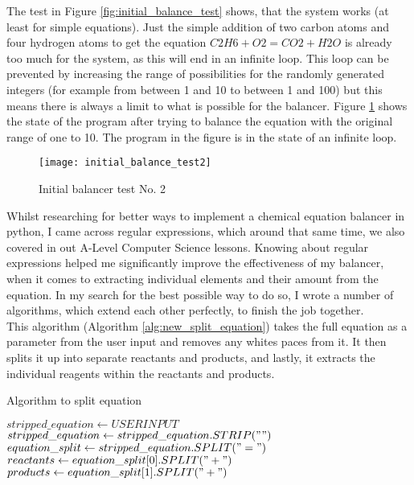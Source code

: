 \documentclass[a4paper,12pt]{article}
\begin{document}
The test in Figure \ref{fig:initial_balance_test} shows, that the system works (at least for simple equations). Just the simple addition of two carbon atoms and four hydrogen atoms to get the equation $ C2H6 + O2 = CO2 + H2O$ is already too much for the system, as this will end in an infinite loop. This loop can be prevented by increasing the range of possibilities for the randomly generated integers (for example from between 1 and 10 to between 1 and 100) but this means there is always a limit to what is possible for the balancer. Figure \ref{fig:second_balance_test} shows the state of the program after trying to balance the equation with the original range of one to 10. The program in the figure is in the state of an infinite loop.

\begin{figure} [h]
	\centering
	\texttt{[image: initial\_balance\_test2]}
	\caption{Initial balancer test No. 2}
	\label{fig:second_balance_test}
\end{figure}

\newpage

Whilst researching for better ways to implement a chemical equation balancer in python, I came across regular expressions, which around that same time, we also covered in out A-Level Computer Science lessons. Knowing about regular expressions helped me significantly improve the effectiveness of my balancer, when it comes to extracting individual elements and their amount from the equation. In my search for the best possible way to do so, I wrote a number of algorithms, which extend each other perfectly, to finish the job together.\\
This algorithm (Algorithm \ref{alg:new_split_equation}) takes the full equation as a parameter from the user input and removes any whites paces from it. It then splits it up into separate reactants and products, and lastly, it extracts the individual reagents within the reactants and products.
\begin{algorithm}
\caption{Algorithm to split equation}\label{alg:new_split_equation}
\begin{algorithmic}
\State $ stripped\_equation \gets USERINPUT$
\State $ stripped\_equation \gets stripped\_equation.STRIP(" ")$
\State $ equation\_split \gets stripped\_equation.SPLIT("=")$
\State $ reactants \gets equation\_split[0].SPLIT("+")$
\State $ products \gets equation\_split[1].SPLIT("+")$
\EndFunction
\end{algorithmic}
\end{algorithm}
\end{document}
